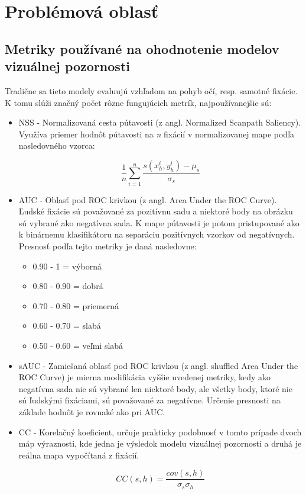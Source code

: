 \section{Problémová oblasť}

\subsection{Metriky používané na ohodnotenie modelov vizuálnej pozornosti}
\label{metric}
Tradične sa tieto modely evaluujú vzhľadom na pohyb očí, resp. samotné fixácie. K tomu slúži značný počet rôzne fungujúcich metrík\cite{metriky}, najpoužívanejšie sú:

\begin{itemize}
	
	\item NSS - Normalizovaná cesta pútavosti (z angl. Normalized Scanpath Saliency). Využíva priemer hodnôt pútavosti na \textit{n} fixácií v normalizovanej mape podľa nasledovného vzorca: 
	
	\begin{equation}
	\frac{1}{n} \sum_{i=1}^{n} \frac{s(x_{h}^{i}, y_{h}^{i}) - \mu_{s}}{\sigma _{s}}
	\end{equation}
	
	\item AUC - Oblasť pod ROC krivkou (z angl. Area Under the ROC Curve).
	Ľudské fixácie sú považované za pozitívnu sadu a niektoré body na obrázku sú vybrané ako negatívna sada. K mape pútavosti je potom pristupované ako k binárnemu klasifikátoru na separáciu pozitívnych vzorkov od negatívnych. Presnosť podľa tejto metriky je daná nasledovne: 
	
	\begin{itemize}
		
		\item 0.90 - 1 = výborná
		\item 0.80 - 0.90 = dobrá
		\item 0.70 - 0.80 = priemerná
		\item 0.60 - 0.70 = slabá
		\item 0.50 - 0.60 = veľmi slabá
		
	\end{itemize}
	
	\item sAUC - Zamiešaná oblasť pod ROC krivkou (z angl. shuffled Area Under the ROC Curve) je mierna modifikácia vyššie uvedenej metriky, kedy ako negatívna sada nie sú vybrané len niektoré body, ale všetky body, ktoré nie sú ľudskými fixáciami, sú považované za negatívne. Určenie presnosti na základe hodnôt je rovnaké ako pri AUC. 
	
	\item CC - Korelačný koeficient, určuje prakticky podobnosť v tomto prípade dvoch máp výraznosti, kde jedna je výsledok modelu vizuálnej pozornosti a druhá je reálna mapa vypočítaná z fixácií. 
	
	\begin{equation}
	CC (s, h) = \frac{cov(s, h)}{\sigma_{s} \sigma _{h}}
	\end{equation}
\end{itemize}
 
